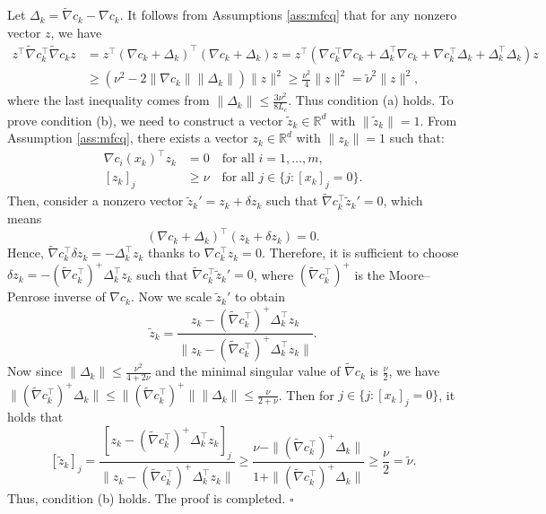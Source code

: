 \documentclass[11pt]{article}
\newenvironment{proof}{{\noindent\it Proof.}\quad}{\hfill $\square$\par}
\newcommand{\R}{\mathbb{R}}
\begin{document}
\begin{proof}
    Let \(\Delta_k = \tilde \nabla c_k - \nabla c_k\). It follows from Assumptions \ref{ass:mfcq}  that for any nonzero vector \(z\), we have
    \begin{align*}
        z^\top \tilde \nabla c_k^\top \tilde \nabla c_k z &= z^\top (\nabla c_k + \Delta_k)^\top (\nabla c_k + \Delta_k) z = z^\top (\nabla c_k^\top \nabla c_k + \Delta_k^\top \nabla c_k + \nabla c_k^\top \Delta_k + \Delta_k^\top \Delta_k) z\\
        &\ge (\nu^2 - 2\|\nabla c_k\|\|\Delta_k\|) \|z\|^2 \geq \frac{\nu^2}{4} \|z\|^2 = \tilde \nu^2 \|z\|^2,
    \end{align*}
    where the last inequality comes from \(\|\Delta_k\| \leq \frac{3\nu^2}{8L_c}\). Thus condition (a) holds.  To prove condition (b), we need to construct a vector \(\tilde z_k \in \R^d\) with \(\|\tilde z_k\| = 1\). From Assumption \ref{ass:mfcq}, there exists a vector \(z_k \in \R^d\) with \(\|z_k\|=1\) such that:
    \begin{align*}
    \nabla c_i(x_k)^\top z_k & = 0 \quad \text{for all } i = 1, \ldots, m,\\
    [z_k]_j &\ge \nu \quad \text{for all } j \in \{ j : [x_k]_j = 0 \}.
    \end{align*}
    Then, consider a nonzero vector \(\tilde z_k' = z_k + \delta z_k\) such that \(\tilde \nabla c_k^\top \tilde z_k' = 0\), which means
    \[
    (\nabla c_k + \Delta_k)^\top (z_k + \delta z_k) = 0.
    \]
    Hence, \(\tilde \nabla c_k^\top \delta z_k = - \Delta_k^\top z_k\) thanks to \(\nabla c_k^\top z_k = 0\). Therefore, it is sufficient to choose \(\delta z_k = -(\tilde \nabla c_k^\top)^+ \Delta_k^\top z_k\) such that \(\tilde \nabla c_k^\top \tilde z_k' = 0\), where \((\tilde \nabla c_k^\top)^+\) is the Moore–Penrose inverse of \(\nabla c_k\). Now we scale \(\tilde z_k'\) to obtain 
    \[
    \tilde z_k = \frac{z_k - (\tilde \nabla c_k^\top)^+ \Delta_k^\top z_k}{\|z_k - (\tilde \nabla c_k^\top)^+ \Delta_k^\top z_k\|}.
    \]
    Now since \(\|\Delta_k\| \leq \frac{\nu^2}{4+2\nu}\) and the minimal singular value of \(\tilde \nabla c_k\) is \(\frac{\nu}{2}\), we have \(\|(\tilde \nabla c_k^\top)^+\Delta_k\| \leq \|(\tilde \nabla c_k^\top)^+\|\|\Delta_k\| \leq \frac{\nu}{2+\nu}\). Then for \(j \in \{ j : [x_k]_j = 0 \}\), it holds that
    \[
    [\tilde z_k]_j =  \frac{[z_k - (\tilde \nabla c_k^\top)^+ \Delta_k^\top z_k]_j}{\|z_k - (\tilde \nabla c_k^\top)^+ \Delta_k^\top z_k\|} \geq \frac{\nu - \|(\tilde \nabla c_k^\top)^+\Delta_k\|}{1+\|(\tilde \nabla c_k^\top)^+\Delta_k\|} \ge \frac{\nu}{2}=\tilde \nu.    \]
    Thus, condition (b) holds. The proof is completed.  %
\end{proof}
\end{document}
